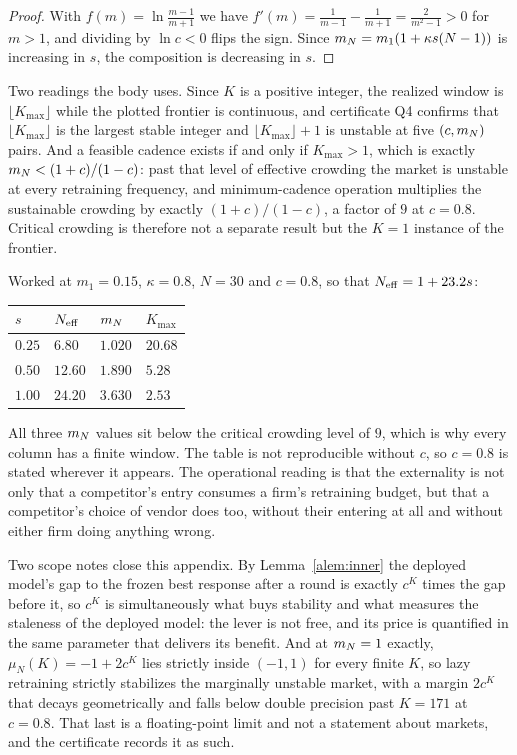 \begin{proof}
With $f(m) = \ln\frac{m-1}{m+1}$ we have $f'(m) = \frac{1}{m-1}-\frac{1}{m+1} = \frac{2}{m^2-1} > 0$ for $m>1$, and dividing by $\ln c < 0$ flips the sign. Since $m_N = m_1(1+\kappa s(N-1))$ is increasing in $s$, the composition is decreasing in $s$.
\end{proof}

Two readings the body uses. Since $K$ is a positive integer, the realized window is $\lfloor K_{\max}\rfloor$ while the plotted frontier is continuous, and certificate Q4 confirms that $\lfloor K_{\max}\rfloor$ is the largest stable integer and $\lfloor K_{\max}\rfloor + 1$ is unstable at five $(c,m_N)$ pairs. And a feasible cadence exists if and only if $K_{\max} > 1$, which is exactly $m_N < (1+c)/(1-c)$: past that level of effective crowding the market is unstable at every retraining frequency, and minimum-cadence operation multiplies the sustainable crowding by exactly $(1+c)/(1-c)$, a factor of $9$ at $c=0.8$. Critical crowding is therefore not a separate result but the $K=1$ instance of the frontier.

Worked at $m_1 = 0.15$, $\kappa=0.8$, $N=30$ and $c=0.8$, so that $N_{\mathrm{eff}} = 1+23.2s$:

\begin{center}
\small
\begin{tabular}{llll}
\toprule
$s$ & $N_{\mathrm{eff}}$ & $m_N$ & $K_{\max}$ \\
\midrule
$0.25$ & $6.80$ & $1.020$ & $20.68$ \\
$0.50$ & $12.60$ & $1.890$ & $5.28$ \\
$1.00$ & $24.20$ & $3.630$ & $2.53$ \\
\bottomrule
\end{tabular}
\end{center}

All three $m_N$ values sit below the critical crowding level of $9$, which is why every column has a finite window. The table is not reproducible without $c$, so $c = 0.8$ is stated wherever it appears. The operational reading is that the externality is not only that a competitor's entry consumes a firm's retraining budget, but that a competitor's choice of vendor does too, without their entering at all and without either firm doing anything wrong.

Two scope notes close this appendix. By Lemma~\ref{alem:inner} the deployed model's gap to the frozen best response after a round is exactly $c^K$ times the gap before it, so $c^K$ is simultaneously what buys stability and what measures the staleness of the deployed model: the lever is not free, and its price is quantified in the same parameter that delivers its benefit. And at $m_N = 1$ exactly, $\mu_N(K) = -1 + 2c^K$ lies strictly inside $(-1,1)$ for every finite $K$, so lazy retraining strictly stabilizes the marginally unstable market, with a margin $2c^K$ that decays geometrically and falls below double precision past $K=171$ at $c=0.8$. That last is a floating-point limit and not a statement about markets, and the certificate records it as such.
